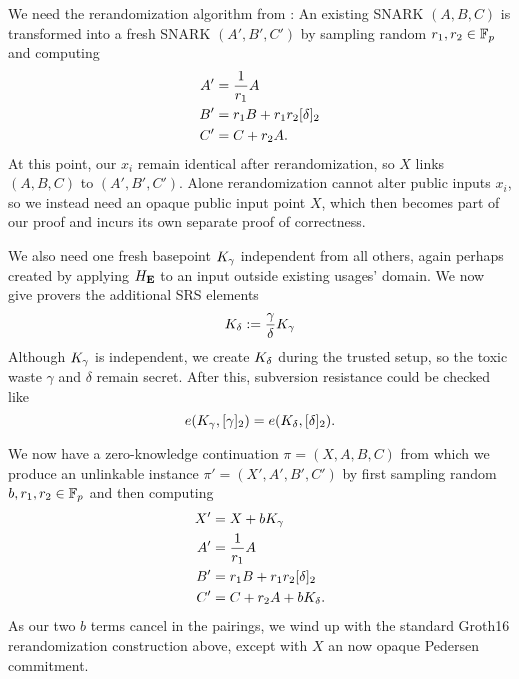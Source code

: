 We need the rerandomization algorithm from \cite[Fig.~1]{RandomizationGroth16}:
An existing SNARK $(A,B,C)$ is transformed into a fresh
SNARK $(A',B',C')$ by sampling random $r_1,r_2 \in \mathbb{F}_p$ and computing
$$ \begin{aligned}
A' &= {1 \over r_1} A \\
B' &= r_1 B + r_1 r_2 [\delta]_2 \\
C' &= C + r_2 A . \\
\end{aligned} $$
At this point, our $x_i$ remain identical after rerandomization,
so $X$ links $(A,B,C)$ to $(A',B',C')$.
Alone rerandomization cannot alter public inputs $x_i$, so
we instead need an opaque public input point $X$, which then becomes
part of our proof and incurs its own separate proof of correctness.

We also need one fresh basepoint $K_\gamma$ independent from all others,
again perhaps created by applying $H_{\mathbf{E}}$ to an input outside existing usages' domain.
We now give provers the additional SRS elements
$$ K_\delta := {\gamma\over\delta} K_\gamma $$
Although $K_\gamma$ is independent, 
we create $K_\delta$ during the trusted setup,
 so the toxic waste $\gamma$ and $\delta$ remain secret.
After this, subversion resistance could be checked like 
$$ e(K_\gamma, [\gamma]_2) = e(K_\delta, [\delta]_2) . $$

We now have a zero-knowledge continuation $\pi = (X,A,B,C)$ from which
we produce an unlinkable instance $\pi' = (X',A',B',C')$ by
 first sampling random $b,r_1,r_2 \in \mathbb{F}_p$ and then computing
$$ \begin{aligned}
X' &= X + b K_\gamma \\
A' &= {1 \over r_1} A \\
B' &= r_1 B + r_1 r_2 [\delta]_2 \\
C' &= C + r_2 A + b K_\delta . \\
\end{aligned} $$
As our two $b$ terms cancel in the pairings, we wind up with the
standard Groth16 rerandomization construction above,
 except with $X$ an now opaque Pedersen commitment.


